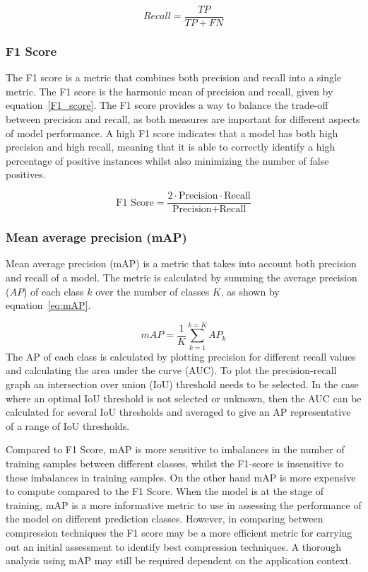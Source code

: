 \begin{equation}
  Recall =   \frac{TP}{TP+FN}
  \label{eq:recall}
\end{equation}

\subsubsection{F1 Score}
The F1 score is a metric that combines both precision and recall into a single metric. The F1 score is the harmonic mean of precision and recall, given by equation~\ref{F1_score}.
%
The F1 score provides a way to balance the trade-off between precision and recall, as both measures are important for different aspects of model performance. A high F1 score indicates that a model has both high precision and high recall, meaning that it is able to correctly identify a high percentage of positive instances whilst also minimizing the number of false positives.

\begin{equation}
  \text{F1 Score} =   \frac{2 \cdot \text{Precision} \cdot \text{Recall}}{\text{Precision} + \text{Recall}}
  \label{F1_score}
\end{equation}

\subsubsection{Mean average precision (mAP)}
Mean average precision (mAP) is a metric that takes into account both precision and recall of a model. 
%
The metric is calculated by summing the average precision ($AP$) of each class $k$ over the number of classes $K$, as shown by equation~\ref{eq:mAP}.  

\begin{equation}
    mAP = \frac{1}{K} \sum_{k=1}^{k=K} AP_k
    \label{eq:mAP}
\end{equation}
The AP of each class is calculated by plotting precision for different recall values and calculating the area under the curve (AUC). To plot the precision-recall graph an intersection over union (IoU) threshold needs to be selected. In the case where an optimal IoU threshold is not selected or unknown, then the AUC can be calculated for several IoU thresholds and averaged to give an AP representative of a range of IoU thresholds.  

Compared to F1 Score, mAP is more sensitive to imbalances in the number of training samples between different classes, whilst the F1-score is insensitive to these imbalances in training samples. On the other hand mAP is more expensive to compute compared to the F1 Score.
%
When the model is at the stage of training, mAP is a more informative metric to use in assessing the performance of the model on different prediction classes. 
%
However, in comparing between compression techniques the F1 score may be a more efficient metric for carrying out an initial assessment to identify best compression techniques. A thorough analysis using mAP may still be required dependent on the application context.


